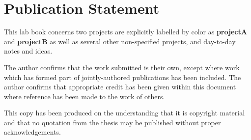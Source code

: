 \chapter*{Publication Statement}
This lab book concerns two projects are explicitly labelled by color as {\color{purple} \bf{projectA}} and {\color{teal} \bf{projectB}}  as well as several other non-specified projects, and day-to-day notes and ideas. 

The author confirms that the work submitted is their own, except where work which has formed part of jointly-authored publications has been included. 
The author confirms that appropriate credit has been given within this document where reference has been made to the work of others.

This copy has been produced on the understanding that it is copyright material and that no quotation from the thesis may be published without proper acknowledgements.

\clearpage